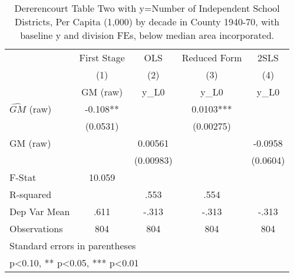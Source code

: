 \begin{table}[htbp]\centering
\def\sym#1{\ifmmode^{#1}\else\(^{#1}\)\fi}
\caption{Dererencourt Table Two with y=Number of Independent School Districts, Per Capita (1,000) by decade in County 1940-70, with baseline y and division FEs, below median area incorporated.}
\begin{tabular}{l*{4}{c}}
\toprule
                    & First Stage   &         OLS   &Reduced Form   &        2SLS   \\
                    &\multicolumn{1}{c}{(1)}&\multicolumn{1}{c}{(2)}&\multicolumn{1}{c}{(3)}&\multicolumn{1}{c}{(4)}\\
                    &\multicolumn{1}{c}{GM  (raw)}&\multicolumn{1}{c}{y\_L0}&\multicolumn{1}{c}{y\_L0}&\multicolumn{1}{c}{y\_L0}\\
\midrule
$\hat{GM}$ (raw)    &      -0.108** &               &      0.0103***&               \\
                    &    (0.0531)   &               &   (0.00275)   &               \\
\addlinespace
GM  (raw)           &               &     0.00561   &               &     -0.0958   \\
                    &               &   (0.00983)   &               &    (0.0604)   \\
\midrule
F-Stat              &      10.059   &               &               &               \\
R-squared           &               &        .553   &        .554   &               \\
Dep Var Mean        &        .611   &       -.313   &       -.313   &       -.313   \\
Observations        &         804   &         804   &         804   &         804   \\
\bottomrule
\multicolumn{5}{l}{\footnotesize Standard errors in parentheses}\\
\multicolumn{5}{l}{\footnotesize * p<0.10, ** p<0.05, *** p<0.01}\\
\end{tabular}
\end{table}

